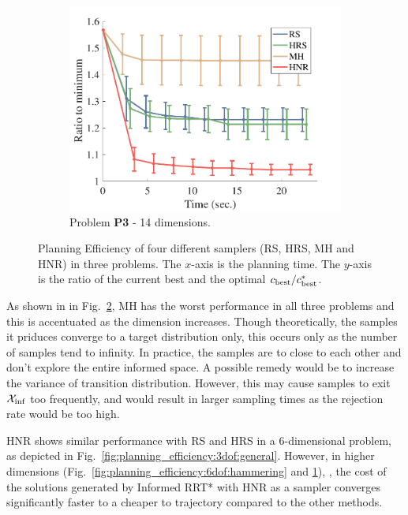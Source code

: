 \documentclass[letterpaper, 10 pt, conference]{ieeeconf}  %
\begin{document}
\begin{figure}[t!]
\begin{subfigure}[b]{0.325\textwidth}
	\includegraphics[width=\linewidth]{fig/planning_efficiency/herb_batting_efficiency}
	\caption{\captionstyle Problem \textbf{P3} - 14 dimensions.}
	\label{fig:planning_efficiency:herb:batting}
    \end{subfigure}
	\caption{\captionstyle Planning Efficiency of four different samplers (RS, HRS, MH and HNR) in three problems. 
	The $x$-axis is the planning time. 
	The $y$-axis is the ratio of the current best and the optimal $ c_{\rm best} / c^*_{\rm best} $.}
	\label{fig:planning_efficiency}
\end{figure} 


As shown in in Fig.~\ref{fig:planning_efficiency}, MH has the worst performance in all three problems and this is accentuated as the dimension increases.
Though theoretically, the samples it priduces converge to a target distribution only,  this occurs only as the number of samples tend to infinity. In practice, the samples are to close to each other and don't explore the entire informed space.
A possible remedy would be to increase the variance of transition distribution. However, this may cause samples to exit $\mathcal{X}_{\rm {inf}}$ too frequently, and would result in larger sampling times as the rejection rate would be too high.

HNR shows similar  performance with RS and HRS in a 6-dimensional problem, as depicted in Fig.~\ref{fig:planning_efficiency:3dof:general}. 
However, in higher dimensions 
(Fig.~\ref{fig:planning_efficiency:6dof:hammering} and \ref{fig:planning_efficiency:herb:batting}), , the cost of the solutions generated by Informed RRT* with HNR as a sampler converges significantly faster to a cheaper to trajectory compared to the other methods.
\end{document}
